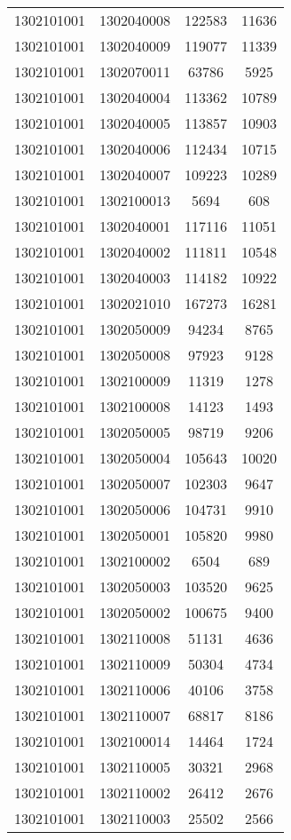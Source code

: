 \begin{longtable}{llcc}
1302101001 & 1302040008 & 122583 & 11636\\
1302101001 & 1302040009 & 119077 & 11339\\
1302101001 & 1302070011 & 63786 & 5925\\
1302101001 & 1302040004 & 113362 & 10789\\
1302101001 & 1302040005 & 113857 & 10903\\
1302101001 & 1302040006 & 112434 & 10715\\
1302101001 & 1302040007 & 109223 & 10289\\
1302101001 & 1302100013 & 5694 & 608\\
1302101001 & 1302040001 & 117116 & 11051\\
1302101001 & 1302040002 & 111811 & 10548\\
1302101001 & 1302040003 & 114182 & 10922\\
1302101001 & 1302021010 & 167273 & 16281\\
1302101001 & 1302050009 & 94234 & 8765\\
1302101001 & 1302050008 & 97923 & 9128\\
1302101001 & 1302100009 & 11319 & 1278\\
1302101001 & 1302100008 & 14123 & 1493\\
1302101001 & 1302050005 & 98719 & 9206\\
1302101001 & 1302050004 & 105643 & 10020\\
1302101001 & 1302050007 & 102303 & 9647\\
1302101001 & 1302050006 & 104731 & 9910\\
1302101001 & 1302050001 & 105820 & 9980\\
1302101001 & 1302100002 & 6504 & 689\\
1302101001 & 1302050003 & 103520 & 9625\\
1302101001 & 1302050002 & 100675 & 9400\\
1302101001 & 1302110008 & 51131 & 4636\\
1302101001 & 1302110009 & 50304 & 4734\\
1302101001 & 1302110006 & 40106 & 3758\\
1302101001 & 1302110007 & 68817 & 8186\\
1302101001 & 1302100014 & 14464 & 1724\\
1302101001 & 1302110005 & 30321 & 2968\\
1302101001 & 1302110002 & 26412 & 2676\\
1302101001 & 1302110003 & 25502 & 2566\\

\end{longtable}
